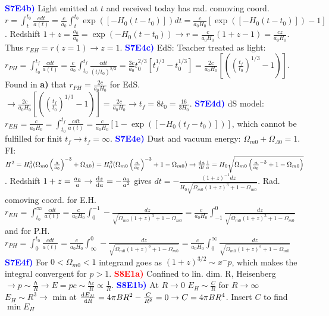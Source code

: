 \documentclass[landscape, a4paper,1pt,english]{article}
\begin{document}
{{{\begin{multicols}{5}
\textcolor{blue}{\textbf{S7E4b)}} Light emitted at $t$ and received today has rad. comoving coord. $r = \int_{t}^{t_0}\frac{cdt}{a(t)} = \frac{c}{a_0}\int_{t}^{t_0} \exp([-H_0(t-t_0)])dt = \frac{c}{a_0H_0}[\exp([-H_0(t-t_0)]) - 1]$. Redshift $1+z = \frac{a_0}{a_0} = \exp(-H_0(t-t_0))\rightarrow
r = \frac{c}{a_0H_0}(1+z-1) = \frac{cz}{a_0H_0}$. Thus $r_{EH} = r(z = 1) \rightarrow z = 1$.
\textcolor{blue}{\textbf{S7E4c)}} EdS: Teacher treated as light: $r_{PH} = \int_{t_0}^{t_f}\frac{cdt}{a(t)} = \frac{c}{a_0}\int_{t_0}^{t_f}\frac{cdt}{(t/t_0)^{2/3}} = \frac{3c}{a_0}t_0^{2/3}[t_f^{1/3} - t_0^{1/3}] = \frac{2c}{a_0H_0}\left[\left( \left(\frac{t_f}{t_0}\right)^{1/3}-1\right)\right]$. Found in \textbf{a)} that $r_{PH} = \frac{2c}{a_0H_0}$ for EdS. $\rightarrow\frac{2c}{a_0H_0}\left[ \left(\left(\frac{t_f}{t_0}\right)^{1/3}-1\right) \right] = \frac{2c}{a_0H_0}\rightarrow t_f = 8t_0 = \frac{16}{3H_0}$.
\textcolor{blue}{\textbf{S7E4d)}} dS model: $r_{EH} =\frac{c}{a_0H_0} = \int_{t_0}^{t_f}\frac{cdt}{a(t)} = \frac{c}{a_0H_0}[1 - \exp([-H_0(t_f - t_0)])]$, which cannot be fulfilled for finit $t_f\rightarrow t_f = \infty$.
\textcolor{blue}{\textbf{S7E4e)}} Dust and vacuum energy: $\Omega_{m0} + \Omega_{\Lambda0} = 1$. FI: $H^2 = H_0^2(\Omega_{m0}\left(\frac{a}{a_0}\right)^{-3} + \Omega_{\Lambda0}) = H_0^2(\Omega_{m0}\left(\frac{a}{a_0}\right)^{-3} + 1-\Omega_{m0})\rightarrow\dv{a}{t}\frac{1}{a} = H_0\sqrt{\Omega_{m0}\left(\frac{a}{a_0}^{-3} + 1 - \Omega_{m0}\right)}$. Redshift $1+z = \frac{a_0}{a}\rightarrow\dv{z}{a} = -\frac{a_0}{a^2}$ gives $dt = -\frac{(1+z)^{-1}dz}{H_0\sqrt{\Omega_{m0}(1+z)^3 + 1 - \Omega_{m0}}}$. Rad. comoving coord. for E.H. $r_{EH} = \int_{t_0}^{\infty}\frac{cdt}{a(t)} = \frac{c}{a_0H_0}\int_{0}^{-1} -\frac{dz}{\sqrt{\Omega_{m0}(1+z)^3 +1 - \Omega_{m0}}} = \frac{c}{a_0 H_0}\int_{-1}^{0}\frac{dz}{\sqrt{\Omega_{m0}(1+z)^3 + 1 - \Omega_{m0}}}$ and for P.H. $r_{PH} = \int_{0}^{t_0}\frac{cdt}{a(t)}=\frac{c}{a_0H_0}\int_{\infty}^{0}-\frac{dz}{\sqrt{\Omega_{m0}(1+z)^3 + 1 -\Omega_{m0}}} = \frac{c}{a_0H_0}\int_{0}^{\infty}\frac{dz}{\sqrt{\Omega_{m0}(1+z)^3 + 1 -\Omega_{m0}}}$
\textcolor{blue}{\textbf{S7E4f)}} For $0<\Omega_{m0}<1$ integrand goes as $(1+z)^{3/2}\sim x^-p$, which makes the integral convergent for $p>1$. 
\textcolor{red}{\textbf{S8E1a)}} Confined to lin. dim. R, Heisenberg $\rightarrow p\sim \frac{\hbar}{R}\rightarrow E = pc \sim \frac{\hbar c}{R}\propto \frac{1}{R}$.
\textcolor{blue}{\textbf{S8E1b)}} At $R\to0$ $E_H\sim\frac{C}{R}$ for $R\to\infty$ $E_H\sim R^3\to$ min at $\dv{E_H}{R} = 4\pi BR^2 - \frac{C}{R^2} = 0\rightarrow C = 4\pi BR^4$. Insert $C$ to find $\min{E_H}$ 

\end{multicols}}}}
\end{document}
